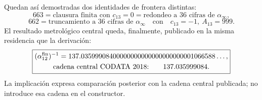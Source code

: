 Quedan así demostradas dos identidades de frontera distintas:
\[
 \boxed{
 663=\text{clausura finita con }c_{13}=0
     =\text{redondeo a 36 cifras de }\alpha_\infty,}
\]
\[
 \boxed{
 662=\text{truncamiento a 36 cifras de }\alpha_\infty
 \quad\text{con}\quad c_{13}=-1,\ A_{13}=999.}
\]
El resultado metrológico central queda, finalmente, publicado en la misma
residencia que la derivación:
\begin{equation}
 \boxed{
 \begin{gathered}
  (\alpha_{12}^{\rm fin})^{-1}
  =137.03599908400000000000000000000001066588\ldots,\\
  \text{cadena central CODATA 2018:}\qquad137.035999084.
 \end{gathered}}
 \label{p12-83-c10-s2:eq:resultado-final-alpha-codata-2018}
\end{equation}
La implicación expresa comparación posterior con la cadena central
publicada; no introduce esa cadena en el constructor.
